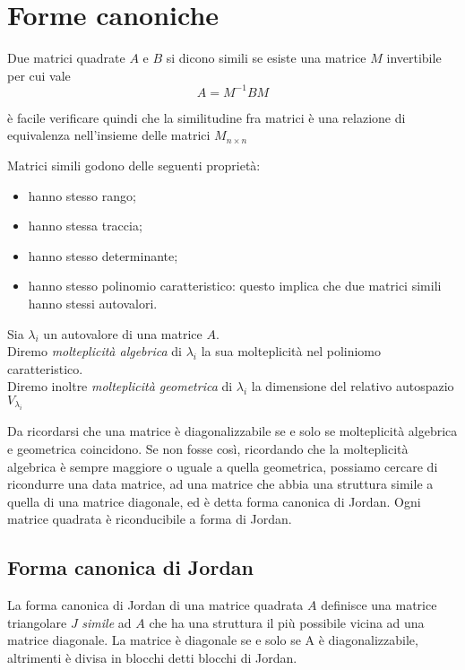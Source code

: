 \section{Forme canoniche}
\begin{defn}
Due matrici quadrate $A$ e $B$ si dicono simili
se esiste una matrice $M$ invertibile per cui vale
$$ A = M^{-1}BM$$
\end{defn}
\`e facile verificare quindi che la similitudine fra matrici
\`e una relazione di equivalenza nell'insieme delle matrici
$M_{n \times n}$
\begin{property}
Matrici simili godono delle seguenti propriet\`a:
\begin{itemize}
 \item hanno stesso rango;
 \item hanno stessa traccia;
 \item hanno stesso determinante;
 \item hanno stesso polinomio caratteristico: questo implica
       che due matrici simili hanno stessi autovalori.
\end{itemize}
\end{property}

\begin{defn}
Sia $\lambda_i$ un autovalore di una matrice $A$.\\
Diremo \emph{molteplicit\`a algebrica} di $\lambda_i$
la sua molteplicit\`a nel poliniomo caratteristico. \\
Diremo inoltre \emph{molteplicit\`a geometrica} di $\lambda_i$
la dimensione del relativo autospazio $V_{\lambda_i}$
\end{defn}
Da ricordarsi che una matrice \`e diagonalizzabile se e solo
se molteplicit\`a algebrica e geometrica coincidono. Se non fosse
così, ricordando che la molteplicit\`a algebrica \`e sempre
maggiore o uguale a quella geometrica, possiamo cercare di ricondurre
una data matrice, ad una matrice che abbia una struttura simile
a quella di una matrice diagonale, ed \`e detta forma canonica
di Jordan. Ogni matrice quadrata \`e riconducibile a forma
di Jordan.

\subsection{Forma canonica di Jordan}
La forma canonica di Jordan di una matrice quadrata $A$ definisce una
matrice triangolare $J$ \emph{simile} ad $A$ che ha una struttura il
più possibile vicina ad una matrice diagonale. La matrice \`e diagonale
se e solo se A \`e diagonalizzabile, altrimenti \`e divisa in blocchi
detti blocchi di Jordan.\\

